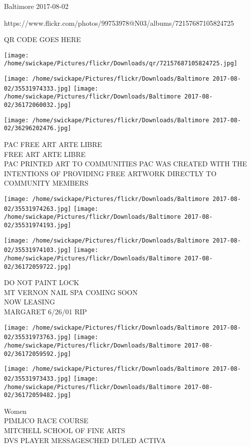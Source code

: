 \documentclass[10pt,letterpaper]{article}
\begin{document}
Baltimore 2017-08-02

https://www.flickr.com/photos/99753978@N03/albums/72157687105824725

QR CODE GOES HERE

\texttt{[image: /home/swickape/Pictures/flickr/Downloads/qr/72157687105824725.jpg]}
\pagebreak

\texttt{[image: /home/swickape/Pictures/flickr/Downloads/Baltimore 2017-08-02/35531974333.jpg]}
\texttt{[image: /home/swickape/Pictures/flickr/Downloads/Baltimore 2017-08-02/36172060032.jpg]}

\vspace{0.25in}
\texttt{[image: /home/swickape/Pictures/flickr/Downloads/Baltimore 2017-08-02/36296202476.jpg]}

PAC FREE ART ARTE LIBRE\\
FREE ART ARTE LIBRE\\
PAC PRINTED ART TO COMMUNITIES PAC WAS CREATED WITH THE INTENTIONS OF PROVIDING FREE ARTWORK DIRECTLY TO COMMUNITY MEMBERS\\
\pagebreak

\texttt{[image: /home/swickape/Pictures/flickr/Downloads/Baltimore 2017-08-02/35531974263.jpg]}
\texttt{[image: /home/swickape/Pictures/flickr/Downloads/Baltimore 2017-08-02/35531974193.jpg]}

\texttt{[image: /home/swickape/Pictures/flickr/Downloads/Baltimore 2017-08-02/35531974103.jpg]}
\texttt{[image: /home/swickape/Pictures/flickr/Downloads/Baltimore 2017-08-02/36172059722.jpg]}

DO NOT PAINT LOCK\\
MT VERNON NAIL SPA COMING SOON\\
NOW LEASING\\
MARGARET 6/26/01 RIP\\
\pagebreak

\texttt{[image: /home/swickape/Pictures/flickr/Downloads/Baltimore 2017-08-02/35531973763.jpg]}
\texttt{[image: /home/swickape/Pictures/flickr/Downloads/Baltimore 2017-08-02/36172059592.jpg]}

\texttt{[image: /home/swickape/Pictures/flickr/Downloads/Baltimore 2017-08-02/35531973433.jpg]}
\texttt{[image: /home/swickape/Pictures/flickr/Downloads/Baltimore 2017-08-02/36172059482.jpg]}

Women\\
PIMLICO RACE COURSE\\
MITCHELL SCHOOL OF FINE ARTS\\
DVS PLAYER MESSAGESCHED DULED ACTIVA\\
\pagebreak
\end{document}
